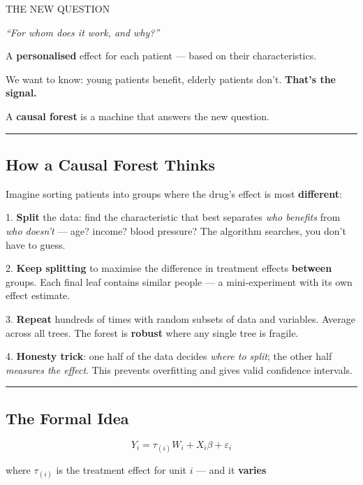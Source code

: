 \documentclass[
  letterpaper,
  DIV=11,
  numbers=noendperiod]{scrartcl}
\begin{document}
{THE NEW QUESTION}

\emph{``For whom does it work, and why?''}

A \textbf{personalised} effect for each patient --- based on their
characteristics.

We want to know: young patients benefit, elderly patients don't.
\textbf{That's the signal.}

{A \textbf{causal forest} is a machine that answers the new question.}

\begin{center}\rule{0.5\linewidth}{0.5pt}\end{center}

\subsection{How a Causal Forest
Thinks}\label{how-a-causal-forest-thinks}

Imagine sorting patients into groups where the drug's effect is most
\textbf{different}:

{1.} \textbf{Split} the data: find the characteristic that best
separates \emph{who benefits} from \emph{who doesn't} --- age? income?
blood pressure? The algorithm searches, you don't have to guess.

{2.} \textbf{Keep splitting} to maximise the difference in treatment
effects \textbf{between} groups. Each final leaf contains similar people
--- a mini-experiment with its own effect estimate.

{3.} \textbf{Repeat} hundreds of times with random subsets of data and
variables. Average across all trees. The forest is \textbf{robust} where
any single tree is fragile.

{4.} \textbf{Honesty trick}: one half of the data decides \emph{where to
split}; the other half \emph{measures the effect}. This prevents
overfitting and gives valid confidence intervals.

\begin{center}\rule{0.5\linewidth}{0.5pt}\end{center}

\subsection{The Formal Idea}\label{the-formal-idea}

\[Y_i = \tau_{(i)} W_i + X_i \beta + \varepsilon_i\]

{where \(\tau_{(i)}\) is the treatment effect for unit \(i\) --- and it
\textbf{varies}}
\end{document}
